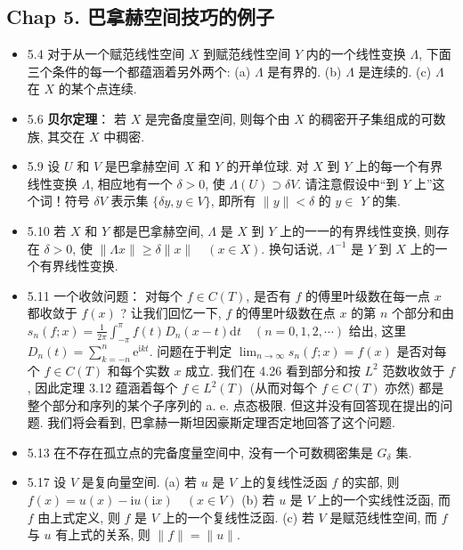 \subsection{Chap 5. 巴拿赫空间技巧的例子}

\begin{itemize}
\item 5.4 对于从一个赋范线性空间 $X$ 到赋范线性空间 $Y$ 内的一个线性变换 $\Lambda$, 下面三个条件的每一个都蕴涵着另外两个: (a) $\Lambda$ 是有界的. (b) $\Lambda$ 是连续的. (c) $\Lambda$ 在 $X$ 的某个点连续.

\item 5.6 \textbf{贝尔定理}： 若 $X$ 是完备度量空间, 则每个由 $X$ 的稠密开子集组成的可数族, 其交在 $X$ 中稠密.

\item 5.9 设 $U$ 和 $V$ 是巴拿赫空间 $X$ 和 $Y$ 的开单位球. 对 $X$ 到 $Y$ 上的每一个有界线性变换 $\Lambda$, 相应地有一个 $\delta>0$, 使 $\Lambda(U) \supset \delta V$. 请注意假设中“到 $Y$ 上”这个词！符号 $\delta V$ 表示集 $\{\delta y, y \in V\}$, 即所有 $\|y\|<\delta$ 的 $y \in$ $Y$ 的集.

\item 5.10 若 $X$ 和 $Y$ 都是巴拿赫空间, $\Lambda$ 是 $X$ 到 $Y$ 上的一一的有界线性变换, 则存在 $\delta>0$, 使 $\|\Lambda x\| \geqslant \delta\|x\| \quad(x \in X)$. 换句话说, $\Lambda^{-1}$ 是 $Y$ 到 $X$ 上的一个有界线性变换.

\item 5.11 一个收敛问题： 对每个 $f \in C(T)$, 是否有 $f$ 的傅里叶级数在每一点 $x$ 都收敛于 $f(x)$ ? 让我们回忆一下, $f$ 的傅里叶级数在点 $x$ 的第 $n$ 个部分和由 $s_{n}(f ; x)=\frac{1}{2 \pi} \int_{-\pi}^{\pi} f(t) D_{n}(x-t) \mathrm{d} t \quad(n=0,1,2, \cdots)$ 给出, 这里 $D_{n}(t)=\sum_{k=-n}^{n} \mathrm{e}^{\mathrm{i} k t}$. 问题在于判定 $\lim _{n \rightarrow \infty} s_{n}(f ; x)=f(x)$ 是否对每个 $f \in C(T)$ 和每个实数 $x$ 成立. 我们在 4.26 看到部分和按 $L^{2}$ 范数收敛于 $f$, 因此定理 3.12 蕴涵着每个 $f \in L^{2}(T)$ (从而对每个 $f \in C(T)$ 亦然) 都是整个部分和序列的某个子序列的 a. e. 点态极限. 但这并没有回答现在提出的问题. 我们将会看到, 巴拿赫一斯坦因豪斯定理否定地回答了这个问题.

\item 5.13 在不存在孤立点的完备度量空间中, 没有一个可数稠密集是 $G_{\delta}$ 集.

\item 5.17 设 $V$ 是复向量空间. (a) 若 $u$ 是 $V$ 上的复线性泛函 $f$ 的实部, 则 $f(x)=u(x)-\mathrm{i} u(\mathrm{i} x) \quad(x \in V)$ (b) 若 $u$ 是 $V$ 上的一个实线性泛函, 而 $f$ 由上式定义, 则 $f$ 是 $V$ 上的一个复线性泛函. (c) 若 $V$ 是赋范线性空间, 而 $f$ 与 $u$ 有上式的关系, 则 $\|f\|=\|u\|$.


\end{itemize}
